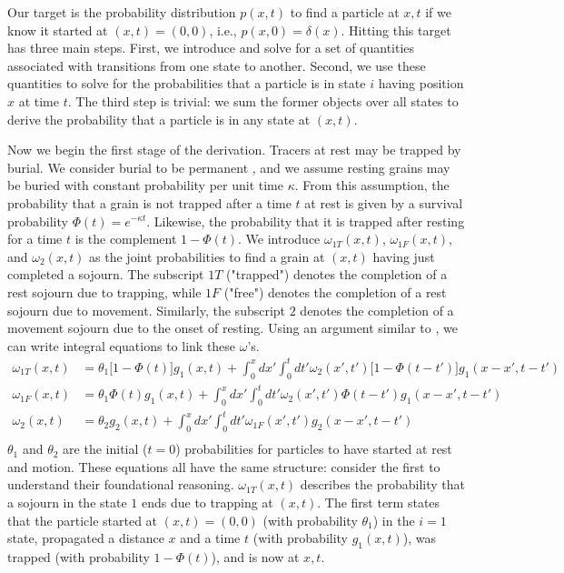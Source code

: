 \documentclass[]{agujournal2018}
\newcommand\om{\omega}
\begin{document}
Our target is the probability distribution $p(x,t)$ to find a particle at $x,t$ if we know it started at $(x,t)=(0,0)$, i.e.,  $p(x,0)=\delta(x).$
Hitting this target has three main steps.
First, we introduce and solve for a set of quantities associated with transitions from one state to another.
Second, we use these quantities to solve for the probabilities that a particle is in state $i$ having position $x$ at time $t$.
The third step is trivial: we sum the former objects over all states to derive the probability that a particle is in any state at $(x,t)$.

Now we begin the first stage of the derivation.
Tracers at rest may be trapped by burial.
We consider burial to be permanent \citep[e.g.][]{Wu2019}, and we assume resting grains may be buried with constant probability per unit time $\kappa$.
From this assumption, the probability that a grain is not trapped after a time $t$ at rest is given by a survival probability $\Phi(t) = e^{-\kappa t}$. Likewise, the probability that it is trapped after resting for a time $t$ is the complement $1-\Phi(t)$.
We introduce $\omega_{1T}(x,t)$, $\omega_{1F}(x,t)$, and $\omega_2(x,t)$ as the joint probabilities to find a grain at $(x,t)$ having just completed a sojourn.
The subscript ${1T}$ ("trapped") denotes the completion of a rest sojourn due to trapping, while $1F$ ("free") denotes the completion of a rest sojourn due to movement.
Similarly, the subscript $2$ denotes the completion of a movement sojourn due to the onset of resting.
Using an argument similar to \citet{Weiss1994}, we can write integral equations to link these $\omega$'s. 
\begin{align}
\om_{1T}(x,t) &= \theta_1\big[1-\Phi(t)\big]g_1(x,t) + \int_0^x dx' \int_0^t dt' \om_2(x',t')\big[1-\Phi(t-t')\big]g_1(x-x',t-t')\label{eq:x}\\
\om_{1F}(x,t) &= \theta_1\Phi(t)g_1(x,t) + \int_0^x dx' \int_0^t dt' \om_2(x',t') \Phi(t-t') g_1(x-x',t-t')\\
\om_2(x,t) &= \theta_2 g_2(x,t) + \int_0^x dx' \int_0^t dt' \om_{1F}(x',t')g_2(x-x',t-t') \\
\end{align}
$\theta_1$ and $\theta_2$ are the initial ($t=0$) probabilities for particles to have started at rest and motion.
These equations all have the same structure: consider the first to understand their foundational reasoning.
$\omega_{1T}(x,t)$ describes the probability that a sojourn in the state $1$ ends due to trapping at $(x,t)$. The first term states that the particle started at $(x,t)=(0,0)$ (with probability $\theta_1$) in the $i=1$ state, propagated a distance $x$ and a time $t$ (with probability $g_1(x,t)$), was trapped (with probability $1-\Phi(t)$), and is now at $x,t$. 
\end{document}
